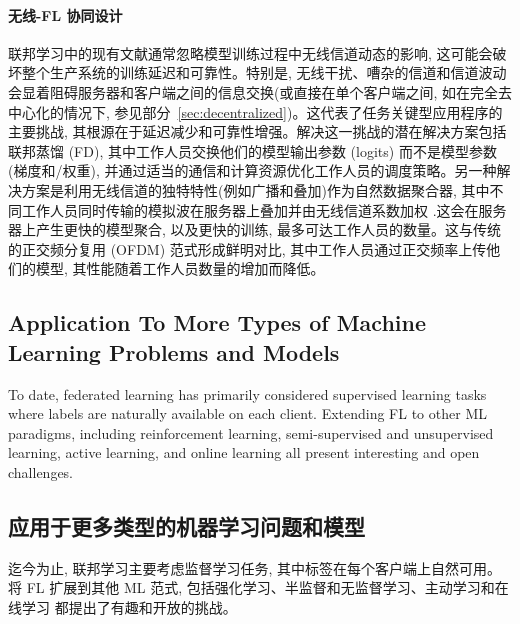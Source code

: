 
\paragraph*{无线-FL 协同设计}

联邦学习中的现有文献通常忽略模型训练过程中无线信道动态的影响, 这可能会破坏整个生产系统的训练延迟和可靠性。特别是, 无线干扰、嘈杂的信道和信道波动会显着阻碍服务器和客户端之间的信息交换(或直接在单个客户端之间, 如在完全去中心化的情况下, 参见部分~\ref{sec:decentralized})。这代表了任务关键型应用程序的主要挑战, 其根源在于延迟减少和可靠性增强。解决这一挑战的潜在解决方案包括联邦蒸馏 (FD), 其中工作人员交换他们的模型输出参数 (logits) 而不是模型参数(梯度和/权重), 并通过适当的通信和计算资源优化工作人员的调度策略\citep{FD, EdgeML, FL5G}。另一种解决方案是利用无线信道的独特特性(例如广播和叠加)作为自然数据聚合器, 其中不同工作人员同时传输的模拟波在服务器上叠加并由无线信道系数加权 \citep{AbariRK16} .这会在服务器上产生更快的模型聚合, 以及更快的训练, 最多可达工作人员的数量。这与传统的正交频分复用 (OFDM) 范式形成鲜明对比, 其中工作人员通过正交频率上传他们的模型, 其性能随着工作人员数量的增加而降低\cite{elgabli2020harnessing}。



\subsection{Application To More Types of Machine Learning Problems and Models}\label{sec:more_types_ml}
To date, federated learning has primarily considered supervised learning tasks where labels are naturally available on each client. Extending FL to other ML paradigms, including reinforcement learning, semi-supervised and unsupervised learning, active learning, and online learning \citep{he2019central,zhao2019decentralized} all present interesting and open challenges.


\subsection*{应用于更多类型的机器学习问题和模型} 
迄今为止, 联邦学习主要考虑监督学习任务, 其中标签在每个客户端上自然可用。将 FL 扩展到其他 ML 范式, 包括强化学习、半监督和无监督学习、主动学习和在线学习 \citep{he2019central,zhao2019decentralized} 都提出了有趣和开放的挑战。

